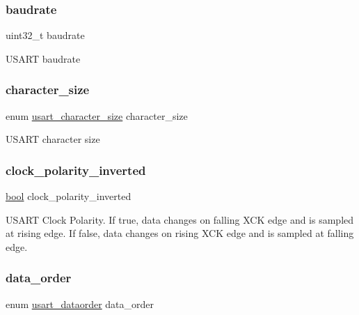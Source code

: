 \subsubsection{\texorpdfstring{baudrate}{baudrate}}
{\footnotesize\ttfamily uint32\+\_\+t baudrate}

U\+S\+A\+RT baudrate \mbox{\label{structusart__config_a30702e47861220f8092295e86df57e3b}} 
\subsubsection{\texorpdfstring{character\_size}{character\_size}}
{\footnotesize\ttfamily enum \mbox{\hyperlink{group__asfdoc__sam0__sercom__usart__group_ga631ce7b4f60dccd392e6d6ef7d3cd4e2}{usart\+\_\+character\+\_\+size}} character\+\_\+size}

U\+S\+A\+RT character size \mbox{\label{structusart__config_ac21b234a3fea28702115e060d7f5b204}} 
\subsubsection{\texorpdfstring{clock\_polarity\_inverted}{clock\_polarity\_inverted}}
{\footnotesize\ttfamily \mbox{\hyperlink{group__group__sam0__utils_ga97a80ca1602ebf2303258971a2c938e2}{bool}} clock\+\_\+polarity\+\_\+inverted}

U\+S\+A\+RT Clock Polarity. If true, data changes on falling X\+CK edge and is sampled at rising edge. If false, data changes on rising X\+CK edge and is sampled at falling edge. \mbox{\label{structusart__config_a4ec56a286aa79454eb9bf4190b85c086}} 
\subsubsection{\texorpdfstring{data\_order}{data\_order}}
{\footnotesize\ttfamily enum \mbox{\hyperlink{group__asfdoc__sam0__sercom__usart__group_ga4352d9150bb8cbd54d26abe3055a5ee1}{usart\+\_\+dataorder}} data\+\_\+order}

